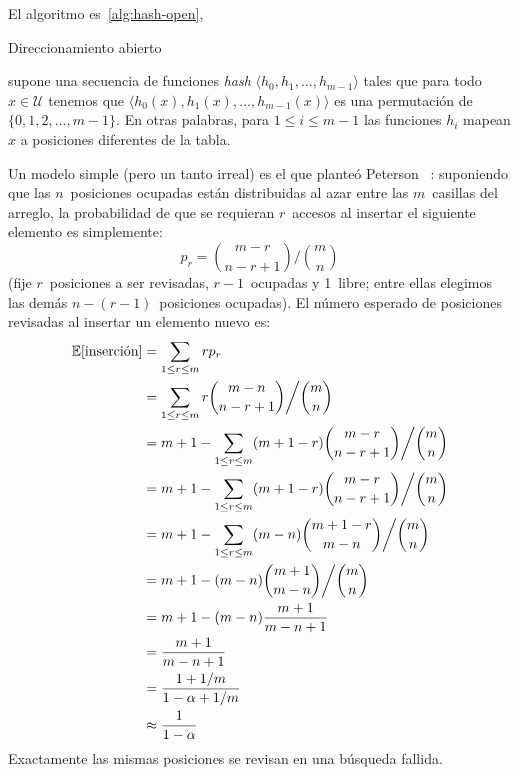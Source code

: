   El algoritmo es~\ref{alg:hash-open},
  \begin{algorithm}[ht]
    \DontPrintSemicolon\Indp

    \caption{Direccionamiento abierto}
    \label{alg:hash-open}
  \end{algorithm}
  supone una secuencia de funciones \emph{\foreignlanguage{english}{hash}}
  \(\langle h_0, h_1, \dotsc, h_{m - 1} \rangle\)
  tales que para todo \(x \in \mathscr{U}\)
  tenemos que
  \(\langle h_0(x), h_1(x), \dotsc, h_{m - 1}(x) \rangle\)
  es una permutación de \(\{ 0, 1, 2, \dotsc, m - 1 \}\).
  En otras palabras,
  para \(1 \le i \le m - 1\)
  las funciones \(h_i\) mapean \(x\) a posiciones diferentes de la tabla.

  Un modelo simple
  (pero un tanto irreal)
  es el que planteó Peterson~%
    \cite{peterson57:_addressing_random_access_storage}:
  suponiendo que las \(n\)~posiciones ocupadas están distribuidas al azar
  entre las \(m\)~casillas del arreglo,
  la probabilidad de que se requieran \(r\)~accesos
  al insertar el siguiente elemento es simplemente:
  \begin{equation*}
    p_r
      = \binom{m - r}{n - r + 1} \bigg/ \binom{m}{n}
  \end{equation*}
  (fije \(r\)~posiciones a ser revisadas,
   \(r - 1\)~ocupadas y \num{1}~libre;
   entre ellas elegimos las demás \(n - (r - 1)\)~posiciones ocupadas).
  El número esperado de posiciones revisadas al insertar un elemento nuevo es:
  \begin{align}
    \operatorname{\mathbb{E}}[\text{inserción}]
      &= \sum_{1 \le r \le m} r p_r \notag \\
      &= \sum_{1 \le r \le m} r \binom{m - n}{n - r + 1} \bigg/ \binom{m}{n} \notag \\
      &= m + 1
           - \sum_{1 \le r \le m}
               (m + 1 - r) \binom{m - r}{n - r + 1} \bigg/ \binom{m}{n} \notag \\
      &= m + 1
           - \sum_{1 \le r \le m}
               (m + 1 - r) \binom{m - r}{n - r + 1} \bigg/ \binom{m}{n} \notag \\
      &= m + 1
           - \sum_{1 \le r \le m}
               (m - n) \binom{m + 1 - r}{m - n} \bigg/ \binom{m}{n} \notag \\
      &= m + 1
           - (m - n) \binom{m + 1}{m - n} \bigg/ \binom{m}{n} \notag \\
      &= m + 1
           - (m - n) \frac{m + 1}{m - n + 1} \notag \\
      &= \frac{m + 1}{m - n + 1} \notag \\
      &= \frac{1 + 1 / m}{1 - \alpha + 1 / m} \notag \\
      &\approx \frac{1}{1 - \alpha}
            \label{eq:open-hashing:insert}
  \end{align}
  Exactamente las mismas posiciones se revisan en una búsqueda fallida.

